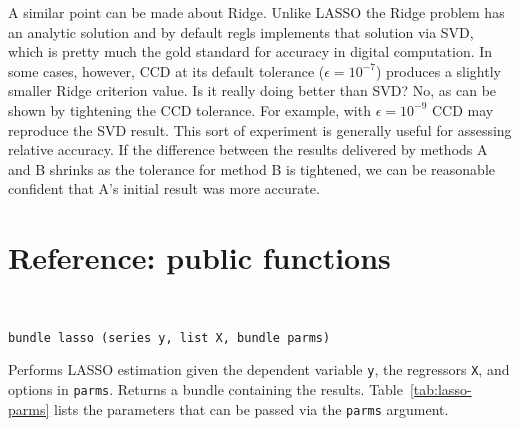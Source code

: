 \documentclass{article}
\newenvironment{funcdoc}
{\noindent\hrulefill\\[-12pt]}
{\medbreak}
\begin{document}
A similar point can be made about Ridge. Unlike LASSO the Ridge
problem has an analytic solution and by default \textsf{regls}
implements that solution via SVD, which is pretty much the gold
standard for accuracy in digital computation. In some cases, however,
CCD at its default tolerance ($\epsilon = 10^{-7}$) produces a
slightly smaller Ridge criterion value. Is it really doing better than
SVD? No, as can be shown by tightening the CCD tolerance. For example,
with $\epsilon = 10^{-9}$ CCD may reproduce the SVD result. This sort
of experiment is generally useful for assessing relative accuracy. If
the difference between the results delivered by methods A and B
shrinks as the tolerance for method B is tightened, we can be
reasonable confident that A's initial result was more accurate.


\section{Reference: public functions}
\label{sec:funcref}

\begin{funcdoc}
\begin{verbatim}
bundle lasso (series y, list X, bundle parms)
\end{verbatim}
  Performs LASSO estimation given the dependent variable \texttt{y},
  the regressors \texttt{X}, and options in \texttt{parms}. Returns a
  bundle containing the results. Table~\ref{tab:lasso-parms} lists the
  parameters that can be passed via the \texttt{parms} argument.
\end{funcdoc}
\end{document}
